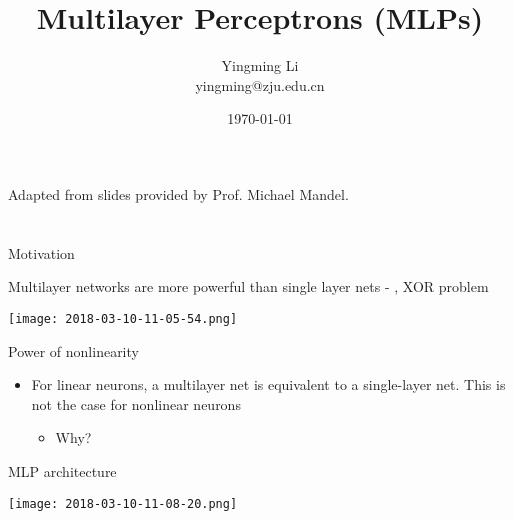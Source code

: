 \documentclass[notes]{beamer}
\title[Opt for ML]{Multilayer Perceptrons (MLPs)}
\author[YingmingLi]{Yingming Li \\ yingming@zju.edu.cn}
\institute[DSERC, ZJU]{Data Science \& Engineering Research Center, ZJU}
\date[\today]{\today}
\providecommand{\tightlist}{%
  \setlength{\itemsep}{0pt}\setlength{\parskip}{0pt}}
\begin{document}

\begin{frame}
	\titlepage
	\begin{center}
		Adapted from slides provided by Prof.  Michael Mandel.		
	\end{center}
\end{frame}
\section{}\label{section}

\begin{frame}{Motivation}

Multilayer networks are more powerful than single layer nets - \eg, XOR
problem

\centering 

\texttt{[image: 2018-03-10-11-05-54.png]}\\

\end{frame}

\begin{frame}{Power of nonlinearity}

\begin{itemize}
\tightlist
\item
  For linear neurons, a multilayer net is equivalent to a single-layer
  net. This is not the case for nonlinear neurons

  \begin{itemize}
  \tightlist
  \item
    Why?
  \end{itemize}
\end{itemize}

\end{frame}

\begin{frame}{MLP architecture}

\centering 

\texttt{[image: 2018-03-10-11-08-20.png]}\\

\end{frame}
\end{document}
